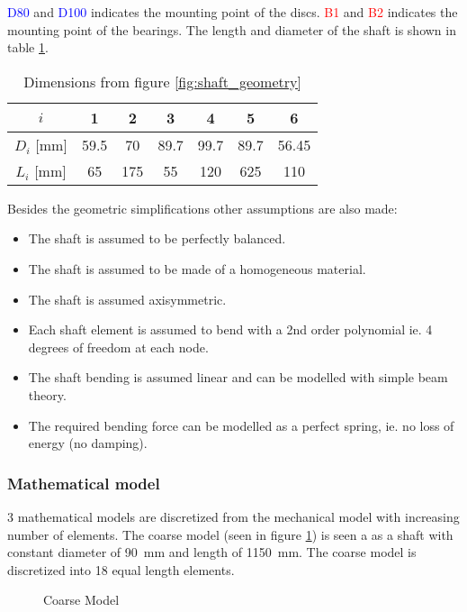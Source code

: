 \textcolor{blue}{D80} and \textcolor{blue}{D100} indicates the mounting point of the discs. \textcolor{red}{B1} and \textcolor{red}{B2} indicates the mounting point of the bearings.
The length and diameter of the shaft is shown in table \ref{tab:shaft_geometry}.
\begin{table}[ht]
    \centering
    \caption{Dimensions from figure \ref{fig:shaft_geometry}}
    \label{tab:shaft_geometry}
    \begin{tabular}{@{}ccccccc@{}}
        \toprule
        $i$  &   1   &   2   &   3   &   4   &   5   &   6   \\ \midrule
        $D_i$ [\si{\milli \meter}]  &   59.5  &   70  &   89.7  &   99.7  &   89.7  &   56.45  \\
        $L_i$ [\si{\milli \meter}]  &   65 &   175    &   55 &   120  &   625  &   110    \\ \bottomrule
    \end{tabular}
\end{table}

Besides the geometric simplifications other assumptions are also made:
\begin{itemize}
    \item The shaft is assumed to be perfectly balanced.
    \item The shaft is assumed to be made of a homogeneous material.
    \item The shaft is assumed axisymmetric.
    \item Each shaft element is assumed to bend with a 2nd order polynomial ie. 4 degrees of freedom at each node.
    \item The shaft bending is assumed linear and can be modelled with simple beam theory.
    \item The required bending force can be modelled as a perfect spring, ie. no loss of energy (no damping).
\end{itemize}

\subsubsection{Mathematical model}
3 mathematical models are discretized from the mechanical model with increasing number of elements. The coarse model (seen in figure \ref{fig:coarse_model}) is seen a as a shaft with constant diameter of \SI{90}{\milli \meter} and length of \SI{1150}{\milli \meter}. The coarse model is discretized into 18 equal length elements.
\begin{figure}[ht]
    \centering
    
    \caption{Coarse Model}
    \label{fig:coarse_model}
\end{figure}


